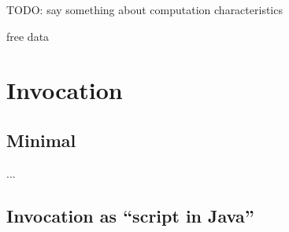 TODO: say something about computation characteristics


free data









\section{Invocation}

\subsection{Minimal}

...



\subsection{Invocation as ``script in Java''}

